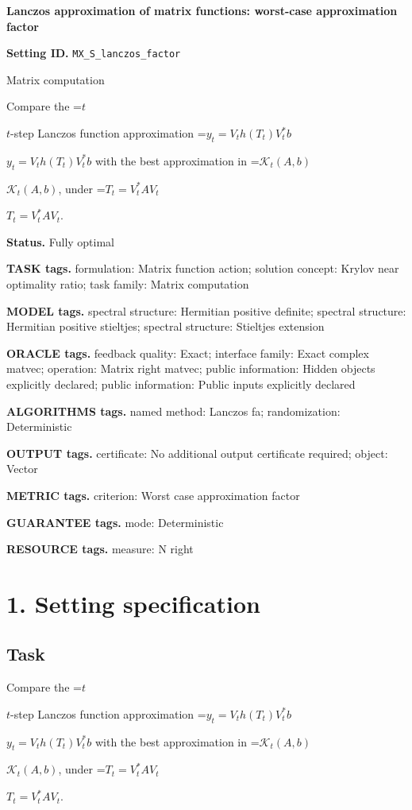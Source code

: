 \documentclass[10pt,a4paper]{article}
\newcommand{\AtlasMath}[1]{\par\begingroup\centering\setbox0=\hbox{$\displaystyle #1$}\ifdim\wd0>1.4\linewidth\typeout{ATLAS WIDE FORMULA: \the\wd0}\fi\ifdim\wd0>\linewidth\resizebox{\linewidth}{!}{\box0}\else\box0\fi\par\endgroup}
\newcommand{\AtlasInlineMath}[1]{\begingroup\setbox0=\hbox{$#1$}\ifdim\wd0>.4\linewidth\endgroup\AtlasMath{#1}\else\endgroup$#1$\fi}
\begin{document}
\raggedright

{\LARGE\bfseries\sffamily\color{AtlasNavy} Lanczos approximation of matrix functions: worst-case approximation factor\par}\vspace{5pt}
\textbf{Setting ID.} \texttt{MX\_\allowbreak{}S\_\allowbreak{}lanczos\_\allowbreak{}factor}

Matrix computation

Compare the \AtlasInlineMath{t}-step Lanczos function approximation \AtlasInlineMath{y_t=V_t h(T_t)V_t^*b} with the best approximation in \AtlasInlineMath{\mathcal{K}_t(A,b)}, under \AtlasInlineMath{T_t=V_t^*AV_t}.

\textbf{Status.} Fully optimal

\textbf{TASK tags.} formulation: Matrix function action; solution concept: Krylov near optimality ratio; task family: Matrix computation

\textbf{MODEL tags.} spectral structure: Hermitian positive definite; spectral structure: Hermitian positive stieltjes; spectral structure: Stieltjes extension

\textbf{ORACLE tags.} feedback quality: Exact; interface family: Exact complex matvec; operation: Matrix right matvec; public information: Hidden objects explicitly declared; public information: Public inputs explicitly declared

\textbf{ALGORITHMS tags.} named method: Lanczos fa; randomization: Deterministic

\textbf{OUTPUT tags.} certificate: No additional output certificate required; object: Vector

\textbf{METRIC tags.} criterion: Worst case approximation factor

\textbf{GUARANTEE tags.} mode: Deterministic

\textbf{RESOURCE tags.} measure: N right

\section{1. Setting specification}
\subsection{Task}
Compare the \AtlasInlineMath{t}-step Lanczos function approximation \AtlasInlineMath{y_t=V_t h(T_t)V_t^*b} with the best approximation in \AtlasInlineMath{\mathcal{K}_t(A,b)}, under \AtlasInlineMath{T_t=V_t^*AV_t}.
\end{document}
